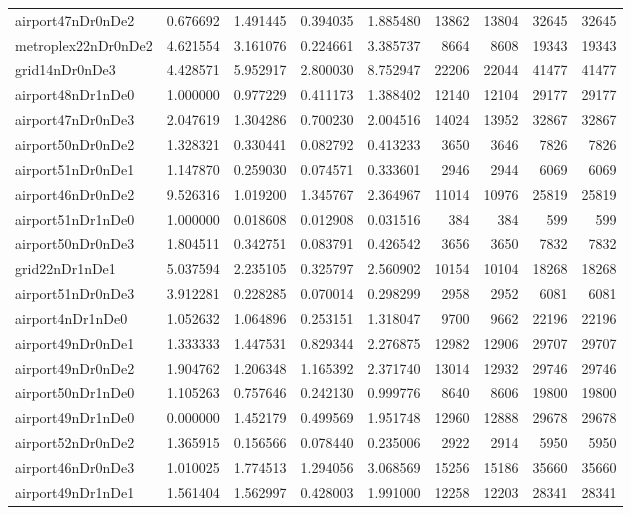 \begin{longtable}{|l|r|r|r|r|r|r|r|r|}
airport47nDr0nDe2 & 0.676692 & 1.491445 & 0.394035 & 1.885480 & 13862 & 13804 & 32645 & 32645 \\
metroplex22nDr0nDe2 & 4.621554 & 3.161076 & 0.224661 & 3.385737 & 8664 & 8608 & 19343 & 19343 \\
grid14nDr0nDe3 & 4.428571 & 5.952917 & 2.800030 & 8.752947 & 22206 & 22044 & 41477 & 41477 \\
airport48nDr1nDe0 & 1.000000 & 0.977229 & 0.411173 & 1.388402 & 12140 & 12104 & 29177 & 29177 \\
airport47nDr0nDe3 & 2.047619 & 1.304286 & 0.700230 & 2.004516 & 14024 & 13952 & 32867 & 32867 \\
airport50nDr0nDe2 & 1.328321 & 0.330441 & 0.082792 & 0.413233 & 3650 & 3646 & 7826 & 7826 \\
airport51nDr0nDe1 & 1.147870 & 0.259030 & 0.074571 & 0.333601 & 2946 & 2944 & 6069 & 6069 \\
airport46nDr0nDe2 & 9.526316 & 1.019200 & 1.345767 & 2.364967 & 11014 & 10976 & 25819 & 25819 \\
airport51nDr1nDe0 & 1.000000 & 0.018608 & 0.012908 & 0.031516 & 384 & 384 & 599 & 599 \\
airport50nDr0nDe3 & 1.804511 & 0.342751 & 0.083791 & 0.426542 & 3656 & 3650 & 7832 & 7832 \\
grid22nDr1nDe1 & 5.037594 & 2.235105 & 0.325797 & 2.560902 & 10154 & 10104 & 18268 & 18268 \\
airport51nDr0nDe3 & 3.912281 & 0.228285 & 0.070014 & 0.298299 & 2958 & 2952 & 6081 & 6081 \\
airport4nDr1nDe0 & 1.052632 & 1.064896 & 0.253151 & 1.318047 & 9700 & 9662 & 22196 & 22196 \\
airport49nDr0nDe1 & 1.333333 & 1.447531 & 0.829344 & 2.276875 & 12982 & 12906 & 29707 & 29707 \\
airport49nDr0nDe2 & 1.904762 & 1.206348 & 1.165392 & 2.371740 & 13014 & 12932 & 29746 & 29746 \\
airport50nDr1nDe0 & 1.105263 & 0.757646 & 0.242130 & 0.999776 & 8640 & 8606 & 19800 & 19800 \\
airport49nDr1nDe0 & 0.000000 & 1.452179 & 0.499569 & 1.951748 & 12960 & 12888 & 29678 & 29678 \\
airport52nDr0nDe2 & 1.365915 & 0.156566 & 0.078440 & 0.235006 & 2922 & 2914 & 5950 & 5950 \\
airport46nDr0nDe3 & 1.010025 & 1.774513 & 1.294056 & 3.068569 & 15256 & 15186 & 35660 & 35660 \\
airport49nDr1nDe1 & 1.561404 & 1.562997 & 0.428003 & 1.991000 & 12258 & 12203 & 28341 & 28341 \\

\end{longtable}
